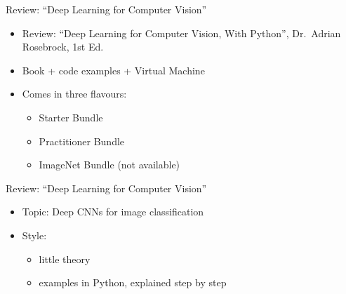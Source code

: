 \documentclass[ignorenonframetext,]{beamer}
\providecommand{\tightlist}{%
  \setlength{\itemsep}{0pt}\setlength{\parskip}{0pt}}
\begin{document}
\begin{frame}{Review: ``Deep Learning for Computer Vision''}

\begin{itemize}
\item
  Review: ``Deep Learning for Computer Vision, With Python'', Dr.~Adrian
  Rosebrock, 1st Ed.
\item
  Book + code examples + Virtual Machine
\item
  Comes in three flavours:

  \begin{itemize}
  \tightlist
  \item
    Starter Bundle
  \item
    Practitioner Bundle
  \item
    ImageNet Bundle (not available)
  \end{itemize}
\end{itemize}

\end{frame}

\begin{frame}{Review: ``Deep Learning for Computer Vision''}

\begin{itemize}
\item
  Topic: Deep CNNs for image classification
\item
  Style:

  \begin{itemize}
  \tightlist
  \item
    little theory
  \item
    examples in Python, explained step by step
  \end{itemize}
\end{itemize}

\end{frame}
\end{document}
